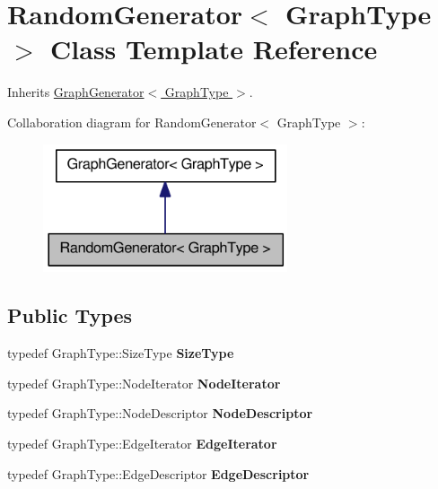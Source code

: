 \hypertarget{class_random_generator}{
\section{RandomGenerator$<$ GraphType $>$ Class Template Reference}
\label{class_random_generator}
}


Inherits \hyperlink{class_graph_generator}{GraphGenerator$<$ GraphType $>$}.



Collaboration diagram for RandomGenerator$<$ GraphType $>$:\nopagebreak
\begin{figure}[H]
\begin{center}
\leavevmode
\includegraphics[width=204pt]{class_random_generator__coll__graph}
\end{center}
\end{figure}
\subsection*{Public Types}
\begin{DoxyCompactItemize}
\item 
\hypertarget{class_random_generator_a4cbbf79c8d9b47a7ca65dc2273b7c7e1}{
typedef GraphType::SizeType {\bfseries SizeType}}
\label{class_random_generator_a4cbbf79c8d9b47a7ca65dc2273b7c7e1}

\item 
\hypertarget{class_random_generator_ab48f1a16626ece4496aefb792932283b}{
typedef GraphType::NodeIterator {\bfseries NodeIterator}}
\label{class_random_generator_ab48f1a16626ece4496aefb792932283b}

\item 
\hypertarget{class_random_generator_a83887d3c97dae6ca9112d12e13848d17}{
typedef GraphType::NodeDescriptor {\bfseries NodeDescriptor}}
\label{class_random_generator_a83887d3c97dae6ca9112d12e13848d17}

\item 
\hypertarget{class_random_generator_adaa2a4a844f6fe32eb72a7f18afa41d4}{
typedef GraphType::EdgeIterator {\bfseries EdgeIterator}}
\label{class_random_generator_adaa2a4a844f6fe32eb72a7f18afa41d4}

\item 
\hypertarget{class_random_generator_ac29b871411e6eb623f55c75dae95ac61}{
typedef GraphType::EdgeDescriptor {\bfseries EdgeDescriptor}}
\label{class_random_generator_ac29b871411e6eb623f55c75dae95ac61}

\end{DoxyCompactItemize}
